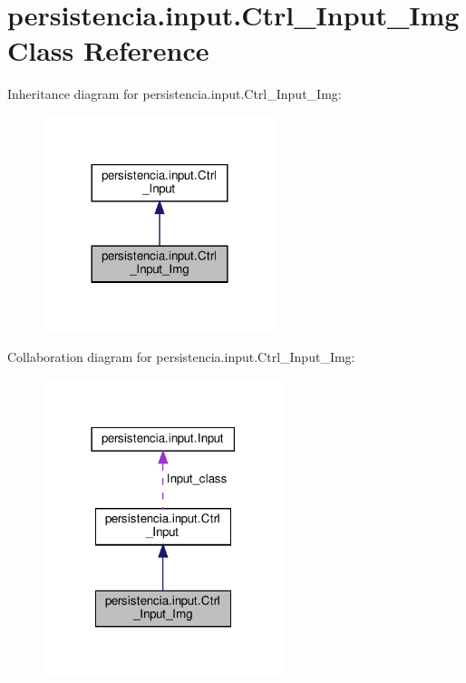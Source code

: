 \hypertarget{classpersistencia_1_1input_1_1Ctrl__Input__Img}{}\section{persistencia.\+input.\+Ctrl\+\_\+\+Input\+\_\+\+Img Class Reference}
\label{classpersistencia_1_1input_1_1Ctrl__Input__Img}


Inheritance diagram for persistencia.\+input.\+Ctrl\+\_\+\+Input\+\_\+\+Img\+:
\nopagebreak
\begin{figure}[H]
\begin{center}
\leavevmode
\includegraphics[width=192pt]{classpersistencia_1_1input_1_1Ctrl__Input__Img__inherit__graph}
\end{center}
\end{figure}


Collaboration diagram for persistencia.\+input.\+Ctrl\+\_\+\+Input\+\_\+\+Img\+:
\nopagebreak
\begin{figure}[H]
\begin{center}
\leavevmode
\includegraphics[width=198pt]{classpersistencia_1_1input_1_1Ctrl__Input__Img__coll__graph}
\end{center}
\end{figure}

